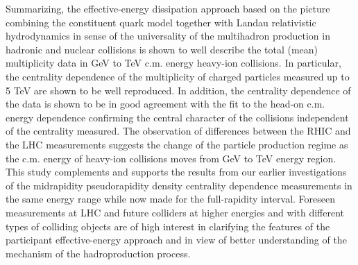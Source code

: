 \documentclass[twocolumn,showpacs,preprintnumbers,prd,superscriptaddress,nofootinbib]{revtex4}
\begin{document}
  Summarizing,
 the effective-energy dissipation approach based on the picture 
 combining 
 the constituent quark model together with Landau relativistic 
hydrodynamics in 
 sense
  of the universality of the multihadron production in 
hadronic and nuclear collisions is shown to well describe the total 
 (mean) multiplicity data 
 in
 GeV to TeV c.m. energy   
 heavy-ion collisions. 
 In particular, 
 the centrality dependence of 
 the multiplicity 
 of charged particles measured 
 up to 5 
 TeV are shown to be well reproduced.
 In addition,
 the centrality dependence of the data is shown to be 
 in good agreement with the fit to the head-on c.m. energy dependence 
 confirming the central character of the collisions independent of the 
 centrality measured. The observation of differences between the RHIC and 
 the LHC measurements suggests the change of the particle 
 production regime  as the c.m. energy of heavy-ion collisions
moves 
from GeV to TeV energy region.
 This study complements and supports the results from our 
 earlier 
 investigations  of the midrapidity pseudorapidity density 
centrality 
dependence measurements in the same energy
 range while now made 
 for the full-rapidity interval.
 Foreseen measurements at LHC and future colliders at higher 
energies and 
 with 
 different  
 types of colliding objects 
 are 
   of 
 high interest 
 in  
 clarifying the features of the 
participant 
 effective-energy approach 
  and 
 in  
 view of 
 better understanding of the mechanism
 of the hadroproduction process.
 \\
 
\end{document}
